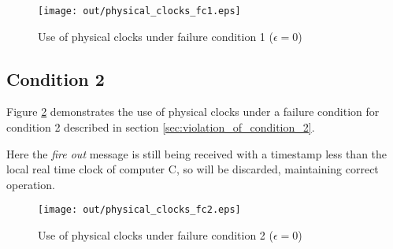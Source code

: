 \documentclass[twocolumn]{article}
\begin{document}
\begin{figure}[h!]
  \centering
  \texttt{[image: out/physical\_clocks\_fc1.eps]}
  \caption{Use of physical clocks under failure condition 1 ($\epsilon = 0$)}
  \label{fig:physical_clocks_fc1}
\end{figure}

\subsection{Condition 2}

Figure \ref{fig:physical_clocks_fc2} demonstrates the use of physical clocks
under a failure condition for condition 2 described in section
\ref{sec:violation_of_condition_2}.

Here the \textit{fire out} message is still being received with a timestamp less
than the local real time clock of computer C, so will be discarded, maintaining
correct operation.

\begin{figure}[h!]
  \centering
  \texttt{[image: out/physical\_clocks\_fc2.eps]}
  \caption{Use of physical clocks under failure condition 2 ($\epsilon = 0$)}
  \label{fig:physical_clocks_fc2}
\end{figure}
\end{document}
